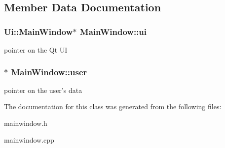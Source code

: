 \subsection{Member Data Documentation}
\hypertarget{class_main_window_a35466a70ed47252a0191168126a352a5}{
\subsubsection[{ui}]{\setlength{\rightskip}{0pt plus 5cm}Ui\-::\-Main\-Window$\ast$ Main\-Window\-::ui\hspace{0.3cm}{\ttfamily [private]}}}\label{class_main_window_a35466a70ed47252a0191168126a352a5}
pointer on the Qt U\-I \hypertarget{class_main_window_a5ad62f9757137d68b2b49bae414c4fdd}{
\subsubsection[{user}]{$\ast$ Main\-Window\-::user\hspace{0.3cm}{\ttfamily [private]}}}\label{class_main_window_a5ad62f9757137d68b2b49bae414c4fdd}
pointer on the user's data 

The documentation for this class was generated from the following files\-:\begin{DoxyCompactItemize}
\item 
mainwindow.\-h\item 
mainwindow.\-cpp\end{DoxyCompactItemize}
